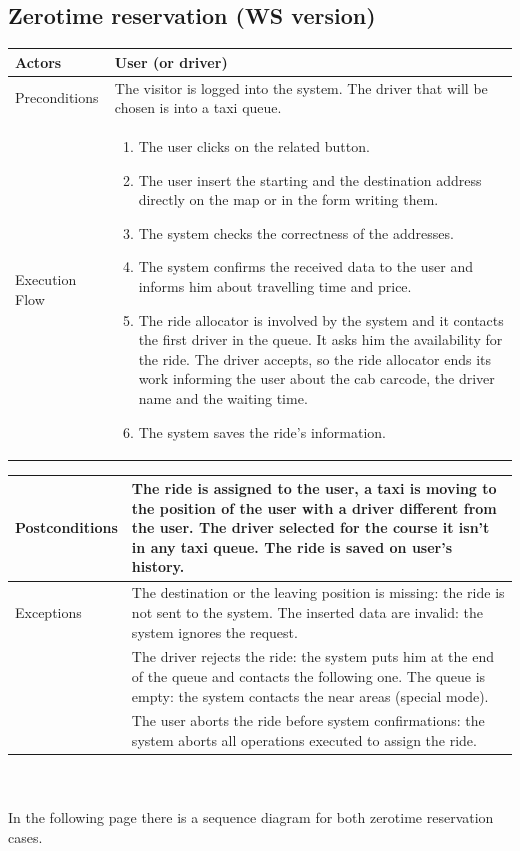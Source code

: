 \subsection{Zerotime reservation (WS version)}
\label{requirements:ZerotimeReservationWS}
\begin{tabular}{lp{8cm}}
	\hline 
	Actors & User (or \Gls{driver})  \\ \hline
	Preconditions & The visitor is logged into the system. The driver that will be chosen is into a taxi queue.  \\ \hline
	Execution Flow &  \begin{enumerate}
					\item The user clicks on the related button.
					\item The user insert the starting and the destination address directly on the \gls{map} or in the form writing them.
					\item The system checks the correctness of the addresses.
					\item The system confirms the received data to the user and informs him about travelling time and price.
					\item The ride allocator is involved by the system and it contacts the first driver in the queue. It asks him the availability for the ride. The driver accepts, so the ride allocator ends its work informing the user about the cab carcode, the driver name and the waiting time.
					\item The system saves the ride's information.
				\end{enumerate}
\\ \hline
\end{tabular}
\newpage
\begin{tabular}{lp{8cm}}
	\hline	 
	 Postconditions & The ride is assigned to the user, a taxi is moving to the position of the user with a driver different from the user. The driver selected for the course it isn't in any taxi queue. The ride is saved on user's history. \\ \hline
	 Exceptions &  The destination or the leaving position is missing: the ride is not sent to the system. The inserted data are invalid: the system ignores the request.\\
& The driver rejects the ride: the system puts him at the end of the queue and contacts the following one. The queue is empty: the system contacts the near areas (special mode).\\
& The user aborts the ride before system confirmations: the system aborts all operations executed to assign the ride.
\\ \hline
\end{tabular}
\\
\\
In the following page there is a sequence diagram for both zerotime \gls{reservation} cases.\\

